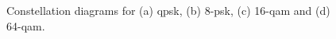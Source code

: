 \begin{figure}[tpb]
\begin{minipage}[h]{0.43\linewidth}
{    }
    \end{minipage}
    \vfill
    \begin{minipage}[h]{0.43\linewidth}
    \end{minipage}
    \hfill
    \begin{minipage}[h]{0.43\linewidth}
    \end{minipage}
    \caption{Constellation diagrams for (a) \acrshort{qpsk}, (b) 8-\acrshort{psk}, (c) 16-\acrshort{qam} and (d) 64-\acrshort{qam}.}
    \label{fig:constil}
\end{figure}


